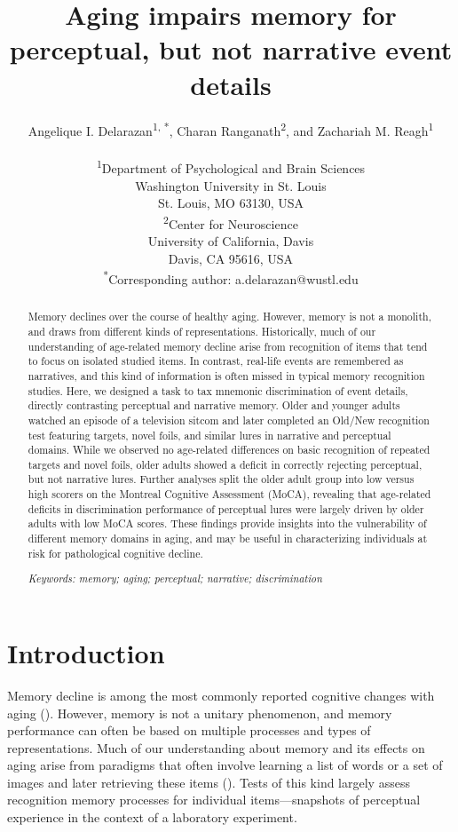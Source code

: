 \documentclass[11pt]{article}
\title{Aging impairs memory for perceptual, but not narrative event details}
\author{Angelique I. Delarazan\textsuperscript{1, *}, Charan Ranganath\textsuperscript{2}, and Zachariah M. Reagh\textsuperscript{1}\\\\ \textsuperscript{1}Department of Psychological and Brain Sciences\\
Washington University in St. Louis \\
St. Louis, MO 63130, USA\\
\textsuperscript{2}Center for Neuroscience\\
University of California, Davis \\
Davis, CA 95616, USA\\
\textsuperscript{*}Corresponding author: a.delarazan@wustl.edu}
\date{}
\begin{document}
\begin{titlepage}
  \maketitle
  \thispagestyle{empty}
  \end{titlepage}

\begin{abstract}
Memory declines over the course of healthy aging. However, memory is not a monolith, and draws from different kinds of representations. Historically, much of our understanding of age-related memory decline arise from recognition of items that tend to focus on isolated studied items. In contrast, real-life events are remembered as narratives, and this kind of information is often missed in typical memory recognition studies.  Here, we designed a task to tax mnemonic discrimination of event details, directly contrasting perceptual and narrative memory. Older and younger adults watched an episode of a television sitcom and later completed an Old/New recognition test featuring targets, novel foils, and similar lures in narrative and perceptual domains. While we observed no age-related differences on basic recognition of repeated targets and novel foils, older adults showed a deficit in correctly rejecting perceptual, but not narrative lures. Further analyses split the older adult group into low versus high scorers on the Montreal Cognitive Assessment (MoCA), revealing that age-related deficits in discrimination performance of perceptual lures were largely driven by older adults with low MoCA scores. These findings provide insights into the vulnerability of different memory domains in aging, and may be useful in characterizing individuals at risk for pathological cognitive decline.

\textit{Keywords: memory; aging; perceptual; narrative; discrimination} 
\end{abstract}

\section*{Introduction}
Memory decline is among the most commonly reported cognitive changes with aging (\cite{craik_memory_1994}). However, memory is not a unitary phenomenon, and memory performance can often be based on multiple processes and types of representations. Much of our understanding about memory and its effects on aging arise from paradigms that often involve learning a list of words or a set of images and later retrieving these items (\cite{fraundorf_aging_2019}). Tests of this kind largely assess recognition memory processes for individual items—snapshots of perceptual experience in the context of a laboratory experiment.
\end{document}
